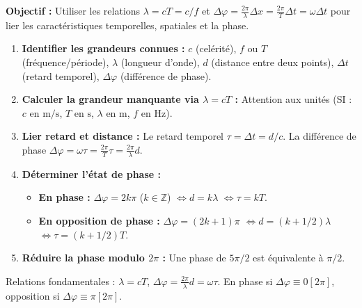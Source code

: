 \documentclass[11pt]{article}
\begin{document}
\begin{methode}
\textbf{Objectif :} Utiliser les relations $\lambda = c T = c/f$ et $\Delta \varphi = \frac{2\pi}{\lambda} \Delta x = \frac{2\pi}{T} \Delta t = \omega \Delta t$ pour lier les caractéristiques temporelles, spatiales et la phase.
\begin{enumerate}
    \item \textbf{Identifier les grandeurs connues :} $c$ (celérité), $f$ ou $T$ (fréquence/période), $\lambda$ (longueur d'onde), $d$ (distance entre deux points), $\Delta t$ (retard temporel), $\Delta \varphi$ (différence de phase).
    \item \textbf{Calculer la grandeur manquante via $\lambda = c T$ :} Attention aux unités (SI : $c$ en $\text{m/s}$, $T$ en $\text{s}$, $\lambda$ en $\text{m}$, $f$ en $\text{Hz}$).
    \item \textbf{Lier retard et distance :} Le retard temporel $\tau = \Delta t = d/c$. La différence de phase $\Delta \varphi = \omega \tau = \frac{2\pi}{T}\tau = \frac{2\pi}{\lambda}d$.
    \item \textbf{Déterminer l'état de phase :}
    \begin{itemize}
        \item \textbf{En phase :} $\Delta \varphi = 2k\pi$ ($k \in \mathbb{Z}$) $\Leftrightarrow d = k\lambda$ $\Leftrightarrow \tau = kT$.
        \item \textbf{En opposition de phase :} $\Delta \varphi = (2k+1)\pi$ $\Leftrightarrow d = (k+1/2)\lambda$ $\Leftrightarrow \tau = (k+1/2)T$.
    \end{itemize}
    \item \textbf{Réduire la phase modulo $2\pi$ :} Une phase de $5\pi/2$ est équivalente à $\pi/2$.
\end{enumerate}
\begin{aretenir}Relations fondamentales : $\lambda = cT$, $\Delta \varphi = \frac{2\pi}{\lambda}d = \omega \tau$. En phase si $\Delta \varphi \equiv 0 [2\pi]$, opposition si $\Delta \varphi \equiv \pi [2\pi]$.\end{aretenir}
\end{methode}
\end{document}
